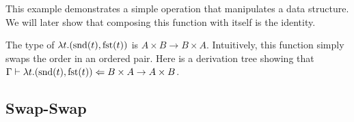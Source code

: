 This example demonstrates a simple operation that manipulates a data structure. We will later show that composing this function with itself is the identity.

\begin{example}\label{swap}
    The type of $\lambda t . (\snd(t), \fst(t))$ is $A \times B \to B \times A$. Intuitively, this function simply swaps the order in an ordered pair. Here is a derivation tree showing that $\Gamma \vdash \lambda t . (\snd(t), \fst(t)) \Leftarrow B \times A \to A \times B$.

    \begin{prooftree}
        
        
    \end{prooftree}
\end{example}

\subsection{Swap-Swap}

